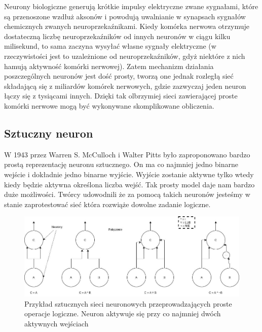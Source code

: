 \documentclass{article}
\begin{document}
Neurony biologiczne generują krótkie impulsy elektryczne zwane sygnałami, które są przenoszone wzdłuż aksonów i powodują uwalnianie w synapsach sygnałów chemicznych zwanych neuroprzekaźnikami. Kiedy komórka nerwowa otrzymuje dostateczną liczbę neuroprzekaźników od innych neuronów w ciągu kilku milisekund, to sama zaczyna wysyłać własne sygnały elektryczne (w rzeczywistości jest to uzależnione od neuroprzekaźników, gdyż niektóre z nich hamują aktywność komórki nerwowej). \cite{geron}
Zatem mechanizm działania poszczególnych neuronów jest dość prosty, tworzą one jednak rozległą sieć składającą się z miliardów komórek nerwowych, gdzie zazwyczaj jeden neuron łączy się z tysiącami innych. Dzięki tak olbrzymiej sieci zawierającej proste komórki nerwowe mogą być wykonywane skomplikowane obliczenia.

\subsection{Sztuczny neuron}
W 1943 przez Warren S. McCulloch i Walter Pitts było zaproponowano bardzo prostą reprezentację neuronu sztucznego. On ma co najmniej jedno binarne wejście i dokładnie jedno binarne wyjście. Wyjście zostanie aktywne tylko wtedy kiedy będzie aktywna określona liczba wejść. \cite{mcculloch1943logical} Tak prosty model daje nam bardzo duże możliwości. Twórcy udowodnili że za pomocą takich neuronów jesteśmy w stanie zaprotestować sieć która rozwiąże dowolne zadanie logiczne.

	
\begin{figure}[H]
	\centering
	\includegraphics[width=\textwidth,keepaspectratio=true]{SSN_simple_neurons}
	\caption{
		Przykład sztucznych sieci neuronowych przeprowadzających proste operacje logiczne. Neuron aktywuje się przy co najmniej dwóch aktywnych wejściach
	}
\end{figure}
\end{document}
